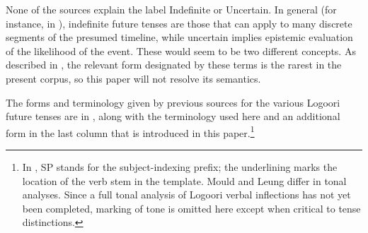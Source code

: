 \documentclass[output=paper]{langsci/langscibook}
\begin{document}
None of the sources explain the label Indefinite or Uncertain. In general (for instance, in \citealt[20]{Johnson1977}), indefinite %
%
%
%
%
future tenses are those that can apply to many discrete segments of the presumed timeline, while uncertain implies epistemic evaluation of the likelihood of the event. These would seem to be two different concepts. As described in , the relevant form designated by these terms is the rarest in the present corpus, so this paper will not resolve its semantics.

The forms and terminology given by previous sources for the various Logoori future tenses are in , along with the terminology used here and an additional form in the last column that is introduced in this paper.\footnote{In , SP stands for the subject-indexing prefix; the underlining marks the location of the verb stem in the template. Mould and Leung differ in tonal analyses. Since a full tonal analysis of Logoori verbal inflections has not yet been completed, marking of tone is omitted here except when critical to tense distinctions.}  
\end{document}
